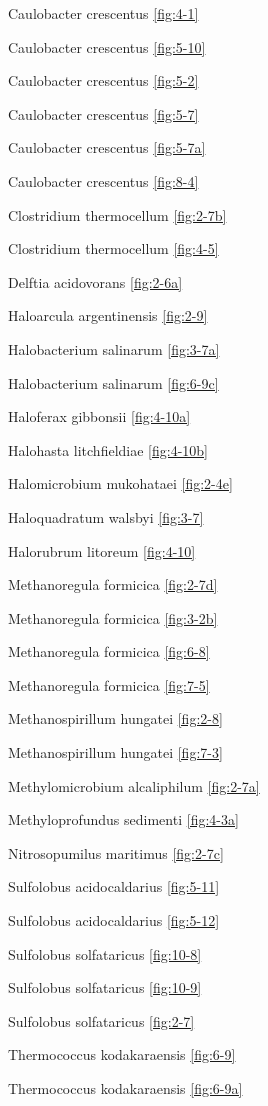 \documentclass[]{tufte-book}
\begin{document}
Caulobacter crescentus \ref{fig:4-1}

Caulobacter crescentus \ref{fig:5-10}

Caulobacter crescentus \ref{fig:5-2}

Caulobacter crescentus \ref{fig:5-7}

Caulobacter crescentus \ref{fig:5-7a}

Caulobacter crescentus \ref{fig:8-4}

Clostridium thermocellum \ref{fig:2-7b}

Clostridium thermocellum \ref{fig:4-5}

Delftia acidovorans \ref{fig:2-6a}

Haloarcula argentinensis \ref{fig:2-9}

Halobacterium salinarum \ref{fig:3-7a}

Halobacterium salinarum \ref{fig:6-9c}

Haloferax gibbonsii \ref{fig:4-10a}

Halohasta litchfieldiae \ref{fig:4-10b}

Halomicrobium mukohataei \ref{fig:2-4e}

Haloquadratum walsbyi \ref{fig:3-7}

Halorubrum litoreum \ref{fig:4-10}

Methanoregula formicica \ref{fig:2-7d}

Methanoregula formicica \ref{fig:3-2b}

Methanoregula formicica \ref{fig:6-8}

Methanoregula formicica \ref{fig:7-5}

Methanospirillum hungatei \ref{fig:2-8}

Methanospirillum hungatei \ref{fig:7-3}

Methylomicrobium alcaliphilum \ref{fig:2-7a}

Methyloprofundus sedimenti \ref{fig:4-3a}

Nitrosopumilus maritimus \ref{fig:2-7c}

Sulfolobus acidocaldarius \ref{fig:5-11}

Sulfolobus acidocaldarius \ref{fig:5-12}

Sulfolobus solfataricus \ref{fig:10-8}

Sulfolobus solfataricus \ref{fig:10-9}

Sulfolobus solfataricus \ref{fig:2-7}

Thermococcus kodakaraensis \ref{fig:6-9}

Thermococcus kodakaraensis \ref{fig:6-9a}
\end{document}
